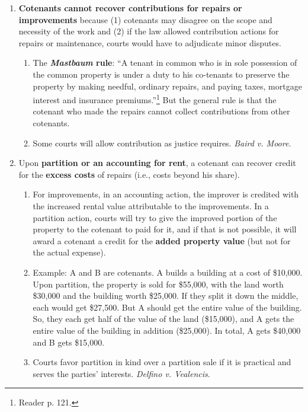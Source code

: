 \begin{enumerate}
    \item \textbf{Cotenants cannot recover contributions for repairs or 
    improvements} because (1) cotenants may disagree on the scope and 
    necessity of the work and (2) if the law allowed contribution actions for 
    repairs or maintenance, courts would have to adjudicate minor disputes.
    \begin{enumerate}
        \item The \textbf{\emph{Mastbaum} rule}: ``A tenant in common who is 
        in sole possession of the common property is under a duty to his 
        co-tenants to preserve the property by making needful, ordinary 
        repairs, and paying taxes, mortgage interest and insurance 
        premiums.''\footnote{Reader p. 121.} But the general rule is that the  
        cotenant who made the repairs cannot collect contributions from other 
        cotenants.
        \item Some courts will allow contribution as justice requires. 
        \emph{Baird v. Moore}.
    \end{enumerate}
    \item Upon \textbf{partition or an accounting for rent}, a cotenant can 
    recover credit for the \textbf{excess costs} of repairs (i.e., costs 
    beyond his share).
    \begin{enumerate}
        \item For improvements, in an accounting action, the improver is 
        credited with the increased rental value attributable to the 
        improvements. In a partition action, courts will try to 
        give the improved portion of the property to the cotenant to paid for 
        it, and if that is not possible, it will award a cotenant a credit for 
        the \textbf{added property value} (but not for the actual expense).
        \item Example: A and B are cotenants. A builds a building at a cost of 
        \$10,000. Upon partition, the property is sold for \$55,000, with the 
        land worth \$30,000 and the building worth \$25,000. If they split it 
        down the middle, each would get \$27,500. But A should get the entire 
        value of the building. So, they each get half of the value of the land 
        (\$15,000), and A gets the entire value of the building in addition 
        (\$25,000). In total, A gets \$40,000 and B gets \$15,000.
        \item Courts favor partition in kind over a partition sale if it is 
        practical and serves the parties' interests. \emph{Delfino v.  
        Vealencis}.
    \end{enumerate}
\end{enumerate}

